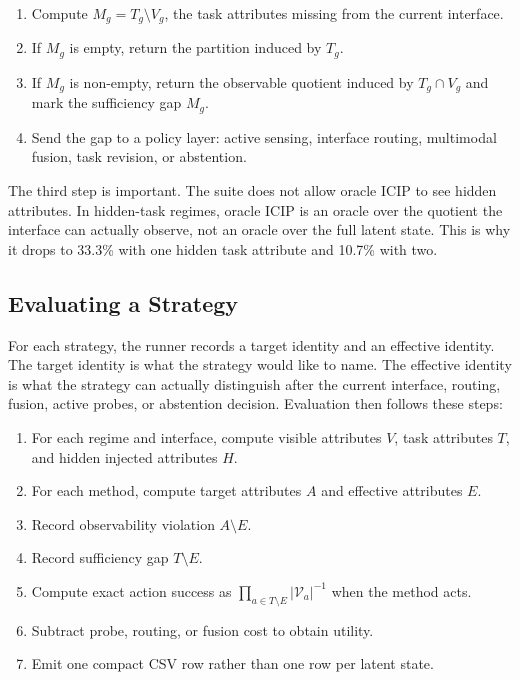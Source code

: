 \documentclass{article}
\newcommand{\icip}{\textsc{ICIP}}
\begin{document}
\begin{enumerate}
    \item Compute $M_g=T_g\setminus V_g$, the task attributes missing from the current interface.
    \item If $M_g$ is empty, return the partition induced by $T_g$.
    \item If $M_g$ is non-empty, return the observable quotient induced by $T_g\cap V_g$ and mark the sufficiency gap $M_g$.
    \item Send the gap to a policy layer: active sensing, interface routing, multimodal fusion, task revision, or abstention.
\end{enumerate}

The third step is important.
The suite does not allow oracle \icip{} to see hidden attributes.
In hidden-task regimes, oracle \icip{} is an oracle over the quotient the interface can actually observe, not an oracle over the full latent state.
This is why it drops to 33.3\% with one hidden task attribute and 10.7\% with two.

\subsection{Evaluating a Strategy}

For each strategy, the runner records a target identity and an effective identity.
The target identity is what the strategy would like to name.
The effective identity is what the strategy can actually distinguish after the current interface, routing, fusion, active probes, or abstention decision.
Evaluation then follows these steps:

\begin{enumerate}
    \item For each regime and interface, compute visible attributes $V$, task attributes $T$, and hidden injected attributes $H$.
    \item For each method, compute target attributes $A$ and effective attributes $E$.
    \item Record observability violation $A\setminus E$.
    \item Record sufficiency gap $T\setminus E$.
    \item Compute exact action success as $\prod_{a\in T\setminus E}|\mathcal{V}_a|^{-1}$ when the method acts.
    \item Subtract probe, routing, or fusion cost to obtain utility.
    \item Emit one compact CSV row rather than one row per latent state.
\end{enumerate}
\end{document}
